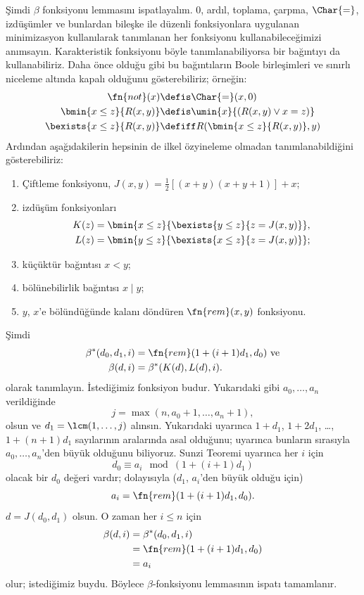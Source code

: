 Şimdi $\beta$ fonksiyonu lemmasını ispatlayalım. $0$, ardıl, toplama,
çarpma, $\Char{=}$, izdüşümler ve bunlardan bileşke ile düzenli fonksiyonlara
uygulanan minimizasyon kullanılarak tanımlanan her fonksiyonu
kullanabileceğimizi anımsayın. Karakteristik fonksiyonu böyle
tanımlanabiliyorsa bir bağıntıyı da kullanabiliriz. Daha önce olduğu gibi bu
bağıntıların Boole birleşimleri ve sınırlı niceleme altında kapalı olduğunu
gösterebiliriz; örneğin:
\begin{align*}
\fn{not}(x) & \defis \Char{=}(x,0)\\
\bmin{x \leq z}{R(x,y)} & \defis \umin{x}{(R(x,y) \lor x = z)}\\
\bexists{x \leq z}{R(x,y)} & \defiff R(\bmin{x \leq z}{R(x,y)}, y)
\end{align*}
Ardından aşağıdakilerin hepsinin de ilkel özyineleme olmadan
tanımlanabildiğini gösterebiliriz:
\begin{enumerate}
\item Çiftleme fonksiyonu, $J(x,y) = \frac{1}{2}[(x+y)(x+y+1)] + x$;
\item izdüşüm fonksiyonları
\begin{align*}
K(z) & = \bmin{x \leq z}{\bexists{y \leq z}{z = J(x,y)}},\\
L(z) & = \bmin{y \leq z}{\bexists{x \leq z}{z = J(x,y)}};
\end{align*}
\item küçüktür bağıntısı $x<y$;
\item bölünebilirlik bağıntısı $x\mid y$;
\item $y$, $x$'e bölündüğünde kalanı döndüren $\fn{rem}(x,y)$ fonksiyonu.
\end{enumerate}
Şimdi
\begin{align*}
\beta^*(d_0,d_1,i) & = \fn{rem}(1+(i+1) d_1,d_0) \text{ ve}\\
\beta(d,i) & = \beta^*(K(d),L(d),i).
\end{align*}
olarak tanımlayın. İstediğimiz fonksiyon budur. Yukarıdaki gibi
$a_0,\dots,a_n$ verildiğinde
\[
j = \max(n,a_0+1,\dots,a_n+1),
\]
olsun ve $d_1=\lcm(1,\dots,j)$ alınsın. Yukarıdaki 
uyarınca $1+d_1$, $1+2d_1$, \dots, $1+(n+1)d_1$ sayılarının aralarında asal
olduğunu;  uyarınca bunların sırasıyla $a_0,\dots,a_n$'den
büyük olduğunu biliyoruz. Sunzi Teoremi uyarınca her $i$ için
\[
d_0 \equiv a_i \mod (1+(i+1)d_1)
\]
olacak bir $d_0$ değeri vardır; dolayısıyla ($d_1$, $a_i$'den büyük olduğu
için)
\[
a_i = \fn{rem}(1+(i+1)d_1,d_0).
\]
$d=J(d_0,d_1)$ olsun. O zaman her $i\le n$ için
\begin{align*}
\beta(d,i) & =  \beta^*(d_0,d_1,i) \\
& =  \fn{rem}(1+(i+1) d_1,d_0) \\
& =  a_i
\end{align*}
olur; istediğimiz buydu. Böylece $\beta$-fonksiyonu lemmasının ispatı
tamamlanır.

